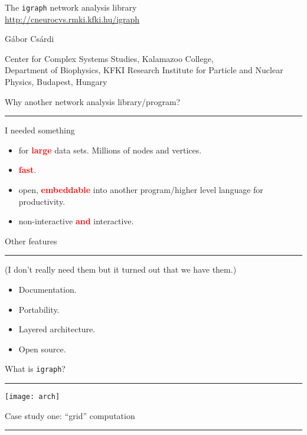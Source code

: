 \documentclass[landscape,20pt]{foils}
\newcommand{\tit}[1]{{\centering\Large #1\par\vspace*{10pt}\hrule}}
\renewcommand{\emph}[1]{\textcolor{red}{\bf #1}}
\begin{document}


\mbox{}\vfill
\begin{center}
\LARGE
The \texttt{igraph} network analysis library\\[10pt]
\normalsize
\url{http://cneurocvs.rmki.kfki.hu/igraph}
\par
\large
G\'abor Cs\'ardi
\par
\normalsize 
Center for Complex Systems Studies, Kalamazoo College,\\
Department of Biophysics, KFKI Research Institute for Particle and
Nuclear Physics, Budapest, Hungary
\end{center}
\vfill

\newpage

\tit{Why another network analysis library/program?}

I needed something
\begin{itemize}
\item for \emph{large} data sets. Millions of nodes and vertices.
\item \emph{fast}.
\item open, \emph{embeddable} into another program/higher level
  language for productivity.
\item non-interactive \emph{and} interactive.
\end{itemize}

\newpage

\tit{Other features}

(I don't really need them but it turned out that we have them.)
\begin{itemize}
\item Documentation. 
\item Portability.
\item Layered architecture.
\item Open source.
\end{itemize}

\newpage

\tit{What is \texttt{igraph}?}
\vfill

\begin{center}
\texttt{[image: arch]}
\end{center}
\vfill

\newpage

\tit{Case study one: ``grid'' computation}
\end{document}
